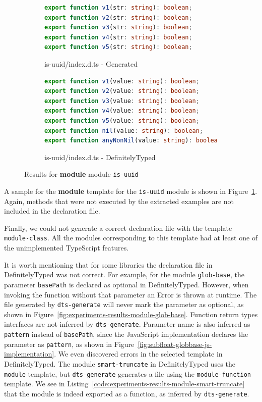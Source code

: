 \documentclass[english,cleveref,autoref,submission]{programming}
\newcommand{\figref}[1]{Figure~\ref{#1}}
\newcommand{\coderef}[1]{Listing~\ref{#1}}
\begin{document}
\begin{figure}[tp]
    \centering
    \begin{subfigure}{0.48\linewidth}
      \begin{lstlisting}[language=TypeScript]
export function v1(str: string): boolean;
export function v2(str: string): boolean;
export function v3(str: string): boolean;
export function v4(str: string): boolean;
export function v5(str: string): boolean;
      \end{lstlisting}
      \caption{is-uuid/index.d.ts - Generated}
    \end{subfigure}
    \hfill
    \begin{subfigure}{0.48\linewidth}
      \begin{lstlisting}[language=TypeScript]
export function v1(value: string): boolean;
export function v2(value: string): boolean;
export function v3(value: string): boolean;
export function v4(value: string): boolean;
export function v5(value: string): boolean;
export function nil(value: string): boolean;
export function anyNonNil(value: string): boolean;
      \end{lstlisting}
      \caption{is-uuid/index.d.ts - DefinitelyTyped}
    \end{subfigure}

    \caption{Results for \textbf{module}  module \texttt{is-uuid}}
    \label{fig:experiments-results-module-is-uuid}
\end{figure}

A sample for the \textbf{module} template
for the \texttt{is-uuid} module is shown in
\figref{fig:experiments-results-module-is-uuid}.
Again, methods that were not executed by the extracted examples are
not included in the declaration file. 

Finally, we could not generate a correct declaration file with the template \texttt{module-class}. All the modules corresponding to this template had at least one of the unimplemented TypeScript features.

It is worth mentioning that for some libraries the declaration file in
DefinitelyTyped was not correct. For example, for the module
\texttt{glob-base}, the parameter \texttt{basePath} is declared as optional in DefinitelyTyped. However, when invoking the function without that parameter an Error is thrown at runtime. The file generated by \texttt{dts-generate} will never mark the parameter as optional, as shown in \figref{fig:experiments-results-module-glob-base}. Function return types interfaces are not inferred by \texttt{dts-generate}. Parameter name is also inferred as \texttt{pattern} instead of \texttt{basePath}, since the JavaScript implementation declares the parameter as \texttt{pattern}, as shown in \figref{fig:subfloat-globbase-js-implementation}. We even discovered errors in the selected template in DefinitelyTyped. The module \texttt{smart-truncate} in DefinitelyTyped uses the \texttt{module} template, but \texttt{dts-generate} generates a file using the \texttt{module-function} template. We see in \coderef{code:experiments-results-module-smart-truncate} that the module is indeed exported as a function, as inferred by \texttt{dts-generate}.
\end{document}
